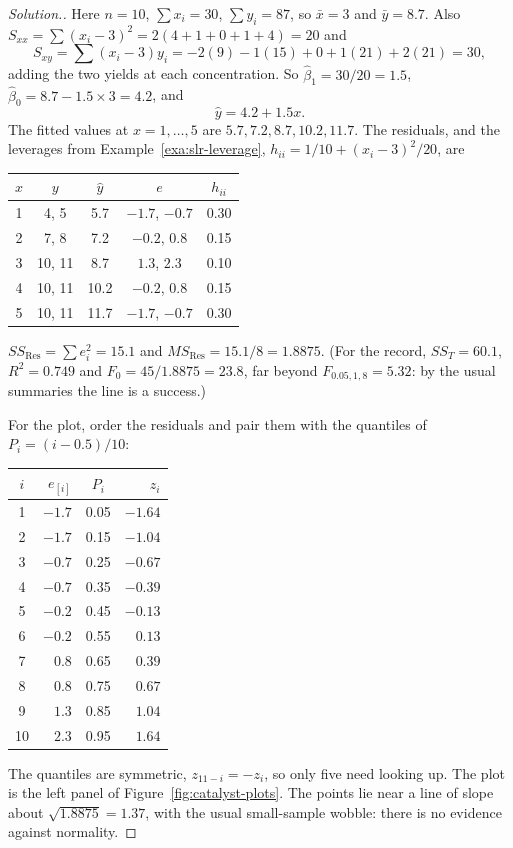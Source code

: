 \documentclass[11pt,a4paper]{article}
\numberwithin{equation}{section}
\theoremstyle{definition}
\newenvironment{solution}
  {\renewcommand{\qedsymbol}{}\begin{proof}[\textit{Solution}.]}
  {\end{proof}}
\begin{document}
\begin{solution}
Here $n = 10$, $\sum x_i = 30$, $\sum y_i = 87$, so $\bar x = 3$ and $\bar y = 8.7$. Also
$S_{xx} = \sum (x_i - 3)^2 = 2(4 + 1 + 0 + 1 + 4) = 20$ and
\[
S_{xy} = \sum (x_i - 3)y_i = -2(9) - 1(15) + 0 + 1(21) + 2(21) = 30 ,
\]
adding the two yields at each concentration. So $\hat\beta_1 = 30/20 = 1.5$,
$\hat\beta_0 = 8.7 - 1.5 \times 3 = 4.2$, and
\[
\hat y = 4.2 + 1.5x .
\]
The fitted values at $x = 1, \dots, 5$ are $5.7, 7.2, 8.7, 10.2, 11.7$. The residuals, and
the leverages from Example~\ref{exa:slr-leverage}, $h_{ii} = 1/10 + (x_i - 3)^2/20$, are
\begin{center}
\begin{tabular}{c|cccc}
$x$ & $y$ & $\hat y$ & $e$ & $h_{ii}$ \\
\hline
1 & 4, 5 & 5.7 & $-1.7$, $-0.7$ & 0.30 \\
2 & 7, 8 & 7.2 & $-0.2$, $0.8$ & 0.15 \\
3 & 10, 11 & 8.7 & $1.3$, $2.3$ & 0.10 \\
4 & 10, 11 & 10.2 & $-0.2$, $0.8$ & 0.15 \\
5 & 10, 11 & 11.7 & $-1.7$, $-0.7$ & 0.30 \\
\end{tabular}
\end{center}
$SS_{\mathrm{Res}} = \sum e_i^2 = 15.1$ and $MS_{\mathrm{Res}} = 15.1/8 = 1.8875$. (For the
record, $SS_T = 60.1$, $R^2 = 0.749$ and $F_0 = 45/1.8875 = 23.8$, far beyond
$F_{0.05,1,8} = 5.32$: by the usual summaries the line is a success.)

For the plot, order the residuals and pair them with the quantiles of
$P_i = (i - 0.5)/10$:
\begin{center}
\begin{tabular}{c|rcr}
$i$ & $e_{[i]}$ & $P_i$ & $z_i$ \\
\hline
1 & $-1.7$ & 0.05 & $-1.64$ \\
2 & $-1.7$ & 0.15 & $-1.04$ \\
3 & $-0.7$ & 0.25 & $-0.67$ \\
4 & $-0.7$ & 0.35 & $-0.39$ \\
5 & $-0.2$ & 0.45 & $-0.13$ \\
6 & $-0.2$ & 0.55 & $0.13$ \\
7 & $0.8$ & 0.65 & $0.39$ \\
8 & $0.8$ & 0.75 & $0.67$ \\
9 & $1.3$ & 0.85 & $1.04$ \\
10 & $2.3$ & 0.95 & $1.64$ \\
\end{tabular}
\end{center}
The quantiles are symmetric, $z_{11 - i} = -z_i$, so only five need looking up. The plot
is the left panel of Figure~\ref{fig:catalyst-plots}. The points lie near a line of slope
about $\sqrt{1.8875} = 1.37$, with the usual small-sample wobble: there is no evidence
against normality.
\end{solution}
\end{document}
